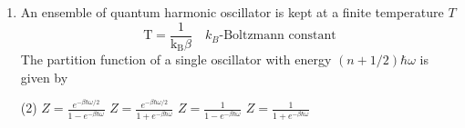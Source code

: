 \begin{enumerate}
	 \begin{tasks}(2)
	\end{tasks}
	\begin{answer}
		\begin{align*}
		\text{Total energy }&=5 \mathrm{E}_{0}
		\intertext{For this 3 bosons must be in $E_0$ state and $1$ in $2E_0$ state.}
		\end{align*}
		\begin{figure}[H]
			\centering
			\texttt{[image: SM-problem-01]}
		\end{figure}
		Correct answer is option \textbf{(b)}
	\end{answer}
	\item An ensemble of quantum harmonic oscillator is kept at a finite temperature $T$ 
	$$\mathrm{T}=\frac{1}{\mathrm{k}_{\mathrm{B}} \beta} \quad
 k_B	\text{-Boltzmann constant}$$
 The partition function of a single oscillator with energy $\left( n+1/2\right) \hbar\omega$ is given by
  \begin{tasks}(2)
 	\task[\textbf{a.}] $Z=\frac{e^{-\beta \hbar \omega / 2}}{1-e^{-\beta \hbar \omega}}$
 	\task[\textbf{b.}]$Z=\frac{e^{-\beta \hbar \omega / 2}}{1+e^{-\beta \hbar \omega}}$
 	\task[\textbf{c.}]$Z=\frac{1}{1-e^{-\beta \hbar \omega}}$
 	\task[\textbf{d.}] $Z=\frac{1}{1+e^{-\beta \hbar \omega}}$
 \end{tasks}
	
	
	
	
	
	
	
	
	
	
	
	
	
	
	
	
	
	
	
	
	
	
	
\end{enumerate}